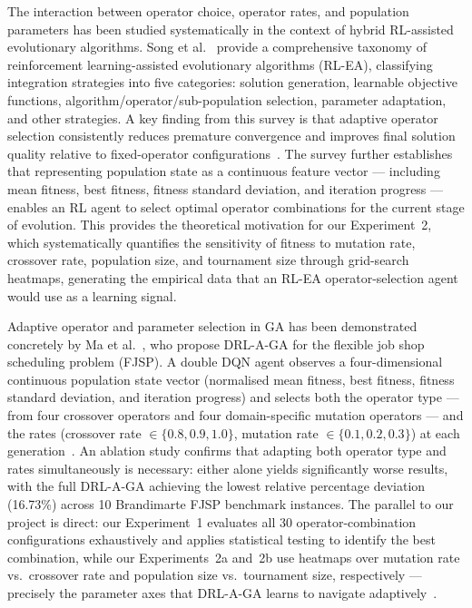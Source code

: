 \documentclass[conference]{IEEEtran}
\begin{document}
The interaction between operator choice, operator rates, and
population parameters has been studied systematically in the
context of hybrid RL-assisted evolutionary algorithms.
Song et al.~\cite{b3} provide a comprehensive taxonomy of
reinforcement learning-assisted evolutionary algorithms (RL-EA),
classifying integration strategies into five categories:
solution generation, learnable objective functions,
algorithm/operator/sub-population selection, parameter
adaptation, and other strategies.
A key finding from this survey is that adaptive operator
selection consistently reduces premature convergence and
improves final solution quality relative to fixed-operator
configurations~\cite{b3}.
The survey further establishes that representing population
state as a continuous feature vector --- including mean fitness,
best fitness, fitness standard deviation, and iteration
progress --- enables an RL agent to select optimal operator
combinations for the current stage of evolution.
This provides the theoretical motivation for our Experiment~2,
which systematically quantifies the sensitivity of fitness to
mutation rate, crossover rate, population size, and tournament
size through grid-search heatmaps, generating the empirical
data that an RL-EA operator-selection agent would use as a
learning signal.

Adaptive operator and parameter selection in GA has been
demonstrated concretely by Ma et al.~\cite{b4}, who propose
DRL-A-GA for the flexible job shop scheduling problem (FJSP).
A double DQN agent observes a four-dimensional continuous
population state vector (normalised mean fitness, best fitness,
fitness standard deviation, and iteration progress) and
selects both the operator type --- from four crossover
operators and four domain-specific mutation operators ---
and the rates (crossover rate $\in \{0.8, 0.9, 1.0\}$,
mutation rate $\in \{0.1, 0.2, 0.3\}$) at each
generation~\cite{b4}.
An ablation study confirms that adapting both operator type
and rates simultaneously is necessary: either alone yields
significantly worse results, with the full DRL-A-GA achieving
the lowest relative percentage deviation (16.73\%) across
10 Brandimarte FJSP benchmark instances.
The parallel to our project is direct: our Experiment~1
evaluates all 30 operator-combination configurations
exhaustively and applies statistical testing to identify
the best combination, while our Experiments~2a and~2b
use heatmaps over mutation rate vs.\ crossover rate and
population size vs.\ tournament size, respectively ---
precisely the parameter axes that DRL-A-GA learns to
navigate adaptively~\cite{b4}.
\end{document}
